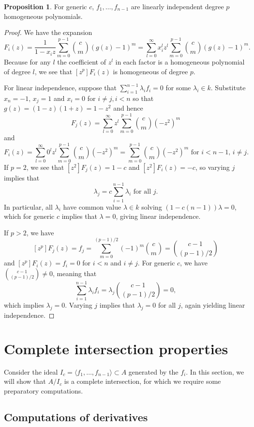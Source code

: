 \documentclass{amsart}
\numberwithin{equation}{section}
\theoremstyle{definition}
\newtheorem{proposition}[theorem]{Proposition}
\begin{document}
\begin{proposition}\label{prop:linind} 
For generic $c$, $f_1, \ldots, f_{n - 1}$ are linearly independent degree $p$ homogeneous polynomials.
\end{proposition} 
\begin{proof} 
We have the expansion
\[
F_i(z)=\frac{1}{1-x_iz}\sum_{m=0}^{p-1} \binom{c}{m} (g(z)-1)^m=\sum_{l=0}^\infty x_i^lz^l\sum_{m=0}^{p-1} \binom{c}{m} (g(z)-1)^m.
\]
Because for any $l$ the coefficient of $z^l$ in each factor is a homogeneous polynomial of degree $l$, we see that $[z^p]F_i(z)$ is homogeneous of degree $p$.

For linear independence, suppose that $\sum_{i=1}^{n-1} \lambda_if_i=0$ for some $\lambda_i \in k$.  Substitute $x_{n} = -1$, $x_j=1$ and $x_i=0$ for $i \ne j,i < n$ so that $g(z)=(1-z)(1+z)=1-z^2$ and hence
\[
F_j(z)=\sum_{l=0}^\infty z^l\sum_{m=0}^{p-1} \binom{c}{m} (-z^2)^m
\]
and 
\[
F_i(z)=\sum_{l=0}^\infty 0^lz^l\sum_{m=0}^{p-1} \binom{c}{m} (-z^2)^m=\sum_{m=0}^{p-1} \binom{c}{m} (-z^2)^m \text{ for $i < n - 1$, $i \neq j$}.
\]
If $p = 2$, we see that $[z^2]F_j(z)=1-c$ and $[z^2]F_i(z)=-c$, so varying $j$ implies that
\[
\lambda_j = c\sum_{i=1}^{n-1} \lambda_i \text{ for all }j.
\]
In particular, all $\lambda_i$ have common value $\lambda \in k$ solving $(1-c(n-1))\lambda = 0$, which for generic $c$ implies that $\lambda = 0$, giving linear independence.

If $p > 2$, we have 
\[
[z^p]F_j(z)=f_j=\sum_{m=0}^{(p-1)/2} (-1)^m\binom{c}{m}=\binom{c-1}{(p-1)/2}
\]
and $[z^p]F_i(z)=f_i=0$ for $i < n$ and $i \neq j$. For generic $c$, we have $\binom{c-1}{(p-1)/2} \ne 0$, meaning that 
\[
\sum_{i=1}^{n-1} \lambda_if_i = \lambda_j\binom{c-1}{(p-1)/2}=0,
\]
which implies $\lambda_j=0$.  Varying $j$ implies that $\lambda_j=0$ for all $j$, again yielding linear independence.
\end{proof}

\section{Complete intersection properties}

Consider the ideal $I_c = \langle f_1, \ldots, f_{n - 1} \rangle \subset A$ generated by the $f_i$.  In this section, we will show that $A/I_c$ is a complete intersection, for which we require some preparatory computations.

\subsection{Computations of derivatives}
\end{document}
